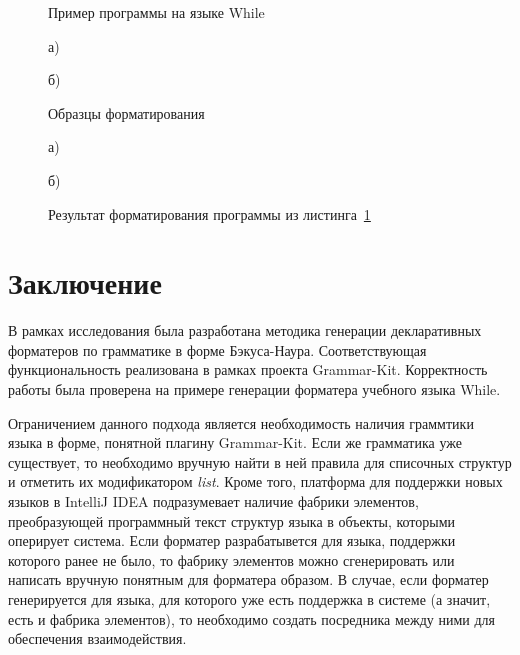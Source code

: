 \documentclass[conference]{IEEEtran}
\begin{document}
\begin{figure}[h]
	\centering
	
	\caption{Пример программы на языке While}
	\label{whileProg}
\end{figure}

\begin{figure}[ht]
\noindent\begin{minipage}{.2\textwidth}
    
\caption*{а)}    
\end{minipage}\hfill
\begin{minipage}{.2\textwidth}
    
\caption*{б)}    
\end{minipage}
\caption{Образцы форматирования}    
\label{whileTs}
\end{figure}

\begin{figure}[ht]
\noindent\begin{minipage}{.2\textwidth}
    
\caption*{а)}    
\end{minipage}\hfill
\begin{minipage}{.2\textwidth}
    
\caption*{б)}    
\end{minipage}
\caption{Результат форматирования программы из листинга~\ref{whileProg}}
\label{whileRes}
\end{figure}

\section{Заключение}
В рамках исследования была разработана методика генерации декларативных форматеров по грамматике в форме Бэкуса-Наура.
Соответствующая функциональность реализована в рамках проекта Grammar-Kit.
Корректность работы была проверена на примере генерации форматера учебного языка While.

Ограничением данного подхода является необходимость наличия граммтики языка в форме, понятной плагину Grammar-Kit. 
Если же грамматика уже существует, то необходимо вручную найти в ней правила для списочных структур и отметить их модификатором \emph{list}.
Кроме того, платформа для поддержки новых языков в IntelliJ IDEA подразумевает наличие фабрики элементов, преобразующей программный текст структур языка в объекты, которыми оперирует система.
Если форматер разрабатывется для языка, поддержки которого ранее не было, то фабрику элементов можно сгенерировать или написать вручную понятным для форматера образом.
В случае, если форматер генерируется для языка, для которого уже есть поддержка в системе (а значит, есть и фабрика элементов), то необходимо создать посредника между ними для обеспечения взаимодействия.
\end{document}
